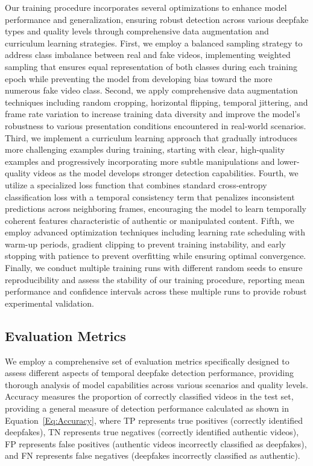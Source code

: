 \documentclass[conference]{IEEEtran}
\begin{document}
Our training procedure incorporates several optimizations to enhance model performance and generalization, ensuring robust detection across various deepfake types and quality levels through comprehensive data augmentation and curriculum learning strategies.
First, we employ a balanced sampling strategy to address class imbalance between real and fake videos, implementing weighted sampling that ensures equal representation of both classes during each training epoch while preventing the model from developing bias toward the more numerous fake video class.
Second, we apply comprehensive data augmentation techniques including random cropping, horizontal flipping, temporal jittering, and frame rate variation to increase training data diversity and improve the model's robustness to various presentation conditions encountered in real-world scenarios.
Third, we implement a curriculum learning approach that gradually introduces more challenging examples during training, starting with clear, high-quality examples and progressively incorporating more subtle manipulations and lower-quality videos as the model develops stronger detection capabilities.
Fourth, we utilize a specialized loss function that combines standard cross-entropy classification loss with a temporal consistency term that penalizes inconsistent predictions across neighboring frames, encouraging the model to learn temporally coherent features characteristic of authentic or manipulated content.
Fifth, we employ advanced optimization techniques including learning rate scheduling with warm-up periods, gradient clipping to prevent training instability, and early stopping with patience to prevent overfitting while ensuring optimal convergence.
Finally, we conduct multiple training runs with different random seeds to ensure reproducibility and assess the stability of our training procedure, reporting mean performance and confidence intervals across these multiple runs to provide robust experimental validation.







\subsection{Evaluation Metrics}
We employ a comprehensive set of evaluation metrics specifically designed to assess different aspects of temporal deepfake detection performance, providing thorough analysis of model capabilities across various scenarios and quality levels.
Accuracy measures the proportion of correctly classified videos in the test set, providing a general measure of detection performance calculated as shown in Equation~\ref{Eq:Accuracy}, where TP represents true positives (correctly identified deepfakes), TN represents true negatives (correctly identified authentic videos), FP represents false positives (authentic videos incorrectly classified as deepfakes), and FN represents false negatives (deepfakes incorrectly classified as authentic).
\end{document}
